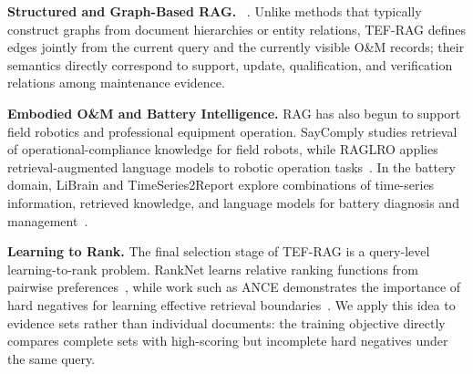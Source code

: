 \textbf{Structured and Graph-Based RAG.}
~\cite{sarthi2024raptor,edge2024graphrag,gutierrez2024hipporag}. Unlike methods that typically construct graphs from document hierarchies or entity relations, TEF-RAG defines edges jointly from the current query and the currently visible O\&M records; their semantics directly correspond to support, update, qualification, and verification relations among maintenance evidence.

\textbf{Embodied O\&M and Battery Intelligence.}
RAG has also begun to support field robotics and professional equipment operation. SayComply studies retrieval of operational-compliance knowledge for field robots, while RAGLRO applies retrieval-augmented language models to robotic operation tasks~\cite{ginting2025saycomply,wang2026raglro}. In the battery domain, LiBrain and TimeSeries2Report explore combinations of time-series information, retrieved knowledge, and language models for battery diagnosis and management~\cite{li2026librain,yang2026timeseries2report}. 

\textbf{Learning to Rank.}
The final selection stage of TEF-RAG is a query-level learning-to-rank problem. RankNet learns relative ranking functions from pairwise preferences~\cite{burges2005ranknet}, while work such as ANCE demonstrates the importance of hard negatives for learning effective retrieval boundaries~\cite{xiong2021ance}. We apply this idea to evidence sets rather than individual documents: the training objective directly compares complete sets with high-scoring but incomplete hard negatives under the same query.
